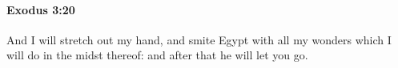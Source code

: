 
		\paragraph{Exodus 3:20} %
			\label{EXODUS-3-20}

			And I will stretch out my hand, and smite Egypt with all my wonders which I will do in the midst thereof: and after that he will let you go.


